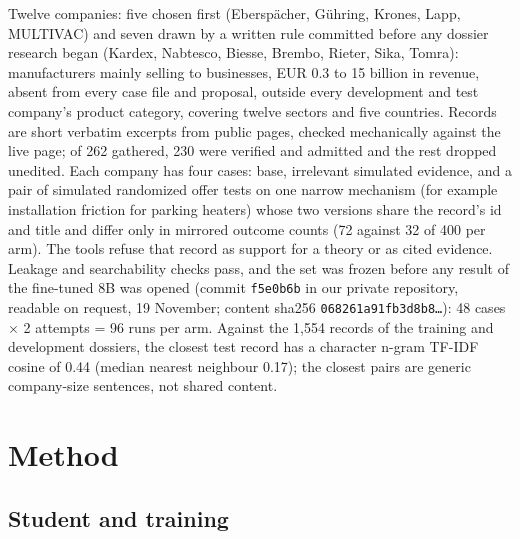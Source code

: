 \documentclass[11pt]{article}
\begin{document}
Twelve companies: five chosen first (Eberspächer, Gühring, Krones, Lapp, MULTIVAC) and seven drawn by a written rule
committed before any dossier research began (Kardex, Nabtesco, Biesse, Brembo, Rieter, Sika, Tomra): manufacturers mainly
selling to businesses, EUR 0.3 to 15 billion in revenue, absent from every case file and proposal, outside every
development and test company's product category, covering twelve sectors and five countries. Records are short
verbatim excerpts from public pages, checked mechanically against the live page; of 262 gathered, 230 were verified
and admitted and the rest dropped unedited. Each company has four cases: base, irrelevant simulated evidence, and a
pair of simulated randomized offer tests on one narrow mechanism (for example installation friction for parking
heaters) whose two versions share the record's id and title and differ only in mirrored outcome counts (72 against 32
of 400 per arm). The tools refuse that record as support for a theory or as cited evidence. Leakage and searchability
checks pass, and the set was frozen before any result of the fine-tuned 8B was opened (commit \texttt{f5e0b6b} in our private repository, readable on request, 19 November; content
sha256 \texttt{068261a91fb3d8b8\ldots}): 48 cases $\times$ 2 attempts = 96 runs per arm. Against the 1,554 records of
the training and development dossiers, the closest test record has a character n-gram TF-IDF cosine of 0.44 (median
nearest neighbour 0.17); the closest pairs are generic company-size sentences, not shared content.

\section{Method}
\label{sec:method}

\subsection{Student and training}
\end{document}
